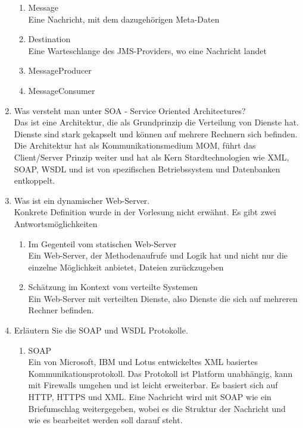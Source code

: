 \begin{enumerate}
\begin{enumerate}
\item Message \\
Eine Nachricht, mit dem dazugehörigen Meta-Daten

\item Destination \\
Eine Warteschlange des JMS-Providers, wo eine Nachricht landet

\item MessageProducer
\item MessageConsumer

\end{enumerate}

\item Was versteht man unter SOA - Service Oriented Architectures? \\
Das ist eine Architektur, die als Grundprinzip die Verteilung von Dienste hat. Dienste sind stark gekapselt und können auf mehrere Rechnern sich befinden. Die Architektur hat als Kommunikationsmedium MOM, führt das Client/Server Prinzip weiter und hat als Kern Stardtechnologien wie XML, SOAP, WSDL und ist von spezifischen Betriebssystem und Datenbanken entkoppelt.

\item Was ist ein dynamischer Web-Server. \\
Konkrete Definition wurde in der Vorlesung nicht erwähnt. Es gibt zwei Antwortsmöglichkeiten

\begin{enumerate}
\item Im Gegenteil vom statischen Web-Server \\
Ein Web-Server, der Methodenaufrufe und Logik hat und nicht nur die einzelne Möglichkeit anbietet, Dateien zurückzugeben

\item Schätzung im Kontext vom verteilte Systemen \\
Ein Web-Server mit verteilten Dienste, also Dienste die sich auf mehreren Rechner befinden.
\end{enumerate}

\item Erläutern Sie die SOAP und WSDL Protokolle. \\

\begin{enumerate}

\item SOAP \\
Ein von Microsoft, IBM und Lotus entwickeltes XML basiertes Kommunikationsprotokoll. Das Protokoll ist Platform unabhängig, kann mit Firewalls umgehen und ist leicht erweiterbar. Es basiert sich auf HTTP, HTTPS und XML. Eine Nachricht wird mit SOAP wie ein Briefumschlag weitergegeben, wobei es die Struktur der Nachricht und wie es bearbeitet werden soll darauf steht.


\end{enumerate}
\end{enumerate}

